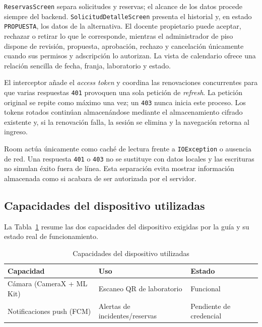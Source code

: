 \texttt{ReservasScreen} separa solicitudes y reservas; el alcance de los
datos procede siempre del backend. \texttt{SolicitudDetalleScreen}
presenta el historial y, en estado \texttt{PROPUESTA}, los datos de la
alternativa. El docente propietario puede aceptar, rechazar o retirar lo
que le corresponde, mientras el administrador de piso dispone de revisión,
propuesta, aprobación, rechazo y cancelación únicamente cuando sus permisos
y adscripción lo autorizan. La vista de calendario ofrece una relación
sencilla de fecha, franja, laboratorio y estado.

El interceptor añade el \emph{access token} y coordina las renovaciones
concurrentes para que varias respuestas \texttt{401} provoquen una sola
petición de \emph{refresh}. La petición original se repite como máximo una
vez; un \texttt{403} nunca inicia este proceso. Los tokens rotados continúan
almacenándose mediante el almacenamiento cifrado existente y, si la
renovación falla, la sesión se elimina y la navegación retorna al ingreso.

Room actúa únicamente como caché de lectura frente a
\texttt{IOException} o ausencia de red. Una respuesta \texttt{401} o
\texttt{403} no se sustituye con datos locales y las escrituras no simulan
éxito fuera de línea. Esta separación evita mostrar información almacenada
como si acabara de ser autorizada por el servidor.

\subsection{Capacidades del dispositivo utilizadas}

La Tabla~\ref{tab:capacidades-movil} resume las dos capacidades del
dispositivo exigidas por la guía y su estado real de funcionamiento.

\begin{table}[htbp]
\centering
\caption{Capacidades del dispositivo utilizadas}
\label{tab:capacidades-movil}
\begin{tabular}{lll}
\toprule
Capacidad & Uso & Estado \\
\midrule
Cámara (CameraX + ML Kit) & Escaneo QR de laboratorio & Funcional \\
Notificaciones push (FCM) & Alertas de incidentes/reservas & Pendiente de credencial \\
\bottomrule
\end{tabular}
\end{table}
